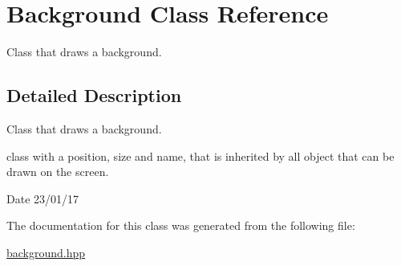 \hypertarget{class_background}{}\section{Background Class Reference}
\label{class_background}


Class that draws a background.  




\subsection{Detailed Description}
Class that draws a background. 

class with a position, size and name, that is inherited by all object that can be drawn on the screen.

\begin{DoxyDate}{Date}
23/01/17 
\end{DoxyDate}


The documentation for this class was generated from the following file\+:\begin{DoxyCompactItemize}
\item 
\hyperlink{background_8hpp}{background.\+hpp}\end{DoxyCompactItemize}
